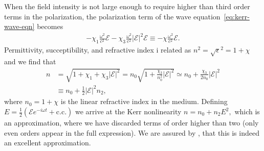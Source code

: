 When the field intensity is not large enough to require higher than
third order terms in the polarization, the polarization term of the
wave equation~\eqref{eq:kerr-wave-eqn} becomes
\begin{align}
  \label{eq:kerr-wave-pol}
  - \chi_1 \frac{\omega^2}{c^2} \mathcal{E}
  - \chi_3 \frac{\omega^2}{c^2} |\mathcal{E}|^2 \mathcal{E}
  \equiv - \chi \frac{\omega^2}{c^2} \mathcal{E}.
\end{align}
Permittivity, succeptibility, and refractive index i related as $n^2 =
\sqrt{\epsilon}^2 = 1 + \chi$ and we find that
\begin{align}
  \label{eq:kerr-n-chi}
  n &= \sqrt{1 + \chi_1 + \chi_3 |\mathcal{E}|^2}
  = n_0 \sqrt{1 + \frac{\chi_3}{n_0^2} |\mathcal{E}|^2}
  \simeq n_0 + \frac{\chi_3}{2n_0} |\mathcal{E}|^2
  \\
  &\equiv n_0 + \tfrac{1}{2} |\mathcal{E}|^2 n_2,
\end{align}
where $n_0 = 1 + \chi$ is the linear refractive index in the
medium. Defining $E = \tfrac{1}{2}( \mathcal{E} e^{-i \omega t} +
\text{c.c.})$ we arrive at the Kerr nonlinearity
$
n = n_0 + n_2 E^2,
$ which is an approximation, where we have discarded terms of order
higher than two (only even orders appear in the full expression). We
are assured by \textcite{milonni}, that this is indeed an excellent
approximation.




